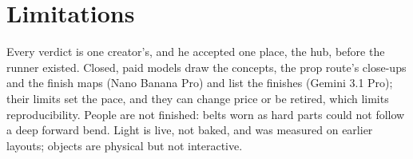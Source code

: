 \section{Limitations}\label{limitations}

Every verdict is one creator's, and he accepted one place, the hub, before the runner existed. Closed, paid models draw the concepts, the prop route's close-ups and the finish maps (Nano Banana Pro) and list the finishes (Gemini 3.1 Pro); their limits set the pace, and they can change price or be retired, which limits reproducibility. People are not finished: belts worn as hard parts could not follow a deep forward bend. Light is live, not baked, and was measured on earlier layouts; objects are physical but not interactive.
